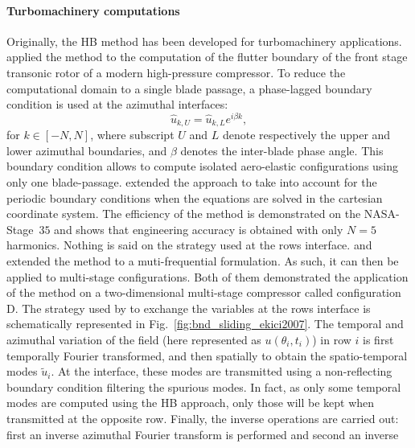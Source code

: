 \paragraph{Turbomachinery computations}
Originally, the HB method has been developed for 
turbomachinery applications.
\citet{Hall2002} applied the method to the computation
of the flutter boundary of the front stage transonic rotor 
of a modern high-pressure compressor. To reduce the
computational domain to a single blade passage, 
a phase-lagged boundary condition is used at the azimuthal
interfaces:
\begin{equation}
	\widehat{u}_{k, U} = \widehat{u}_{k, L} e^{i \beta k},
\end{equation}
for $k \in [-N, N]$, where subscript $U$ and $L$ denote
respectively the upper and lower azimuthal boundaries, and
$\beta$ denotes the inter-blade phase angle. This boundary
condition allows to compute isolated aero-elastic configurations
using only one blade-passage.
 extended the approach to take into account
for the periodic boundary conditions when the equations are solved in the
cartesian coordinate system. The efficiency of the
method is demonstrated on the NASA-Stage~$35$ and shows that
engineering accuracy is obtained with only $N=5$ harmonics.
Nothing is said on the strategy used at the rows interface.
\citet{Ekici2007} and \citet{Gopinath2007}
extended the method to a muti-frequential formulation. 
As such, it can then be applied to multi-stage
configurations. Both of them demonstrated the application of
the method on
a two-dimensional multi-stage compressor called
configuration D. 
The strategy used by \citet{Ekici2007} 
to exchange the variables at
the rows interface is schematically represented 
in Fig.~\ref{fig:bnd_sliding_ekici2007}.
The temporal and azimuthal variation 
of the field (here represented as $u (\theta_i, t_i)$)
in row $i$ is first temporally Fourier transformed, and then
spatially to obtain the spatio-temporal modes $\widetilde{u}_i$.
At the interface, these modes are transmitted using a non-reflecting
boundary condition filtering the spurious modes. In fact, as only some
temporal modes are computed using the HB approach, only
those will be kept when transmitted at the opposite row.
Finally, the inverse operations are carried out: first an inverse
azimuthal Fourier transform is performed and second an inverse
